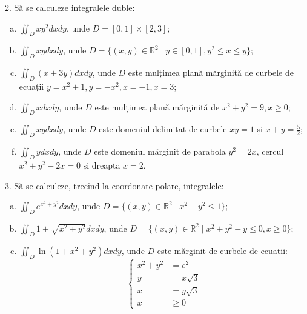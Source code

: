 \documentclass[11pt,a4paper]{article}
\newcommand\ds{\displaystyle}
\newcommand\RR{\mathbb{R}}
\theoremstyle{dotless}
\theoremstyle{dotlessdr}
\begin{document}
2. Să se calculeze integralele duble:
\begin{enumerate}[(a)]
\item $\ds\iint_D xy^2 dxdy$, unde $D = [0, 1] \times [2, 3]$;
\item $\ds\iint_D xy dxdy$, unde $D = \{(x, y) \in \RR^2 \mid y \in [0, 1], y^2 \leq x \leq y\}$;
\item $\ds\iint_D (x + 3y) dxdy$, unde $D$ este mulțimea plană mărginită de curbele
  de ecuații $y = x^2 + 1, y = -x^2, x = -1, x = 3$;
\item $\ds\iint_D xdxdy$, unde $D$ este mulțimea plană mărginită de $x^2 + y^2 = 9, x \geq 0$;
\item $\ds\iint_D xy dxdy$, unde $D$ este domeniul delimitat de curbele $xy = 1$ și
  $x + y = \frac{5}{2}$;
\item $\ds\iint_D ydxdy$, unde $D$ este domeniul mărginit de parabola $y^2 = 2x$,
  cercul $x^2 + y^2 - 2x = 0$ și dreapta $x = 2$.
\end{enumerate}

\vspace{1cm}

3. Să se calculeze, trecînd la coordonate polare, integralele:
\begin{enumerate}[(a)]
\item $\ds\iint_D e^{x^2 + y^2} dxdy$, unde $D = \{(x, y) \in \RR^2 \mid x^2 + y^2 \leq 1 \}$;
\item $\ds\iint_D 1 + \sqrt{x^2 + y^2} dxdy$, unde $D = \{(x, y) \in \RR^2 \mid %
  x^2 + y^2 - y \leq 0, x \geq 0\}$;
\item $\ds\iint_D \ln(1 + x^2 + y^2) dxdy$, unde $D$ este mărginit de curbele de ecuații:
  \[
    \begin{cases}
      x^2 + y^2 &= e^2 \\
      y &= x \sqrt{3} \\
      x &= y\sqrt{3} \\
      x &\geq 0
    \end{cases}
  \]
\end{enumerate}
\end{document}
